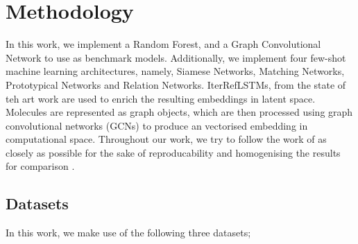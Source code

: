 \section{Methodology}

In this work, we implement a Random Forest, and a Graph Convolutional Network to use as benchmark models. Additionally, we implement four few-shot machine learning architectures, namely, Siamese Networks, Matching Networks, Prototypical Networks and Relation Networks. IterRefLSTMs, from the state of teh art work are used to enrich the resulting embeddings in latent space. Molecules are represented as graph objects, which are then processed using graph convolutional networks (GCNs) to produce an vectorised embedding in computational space. Throughout our work, we try to follow the work of \citet{altae2017low} as closely as possible for the sake of reproducability and homogenising the  results for comparison
.

\subsection{Datasets}

In this work, we make use of the following three datasets;

